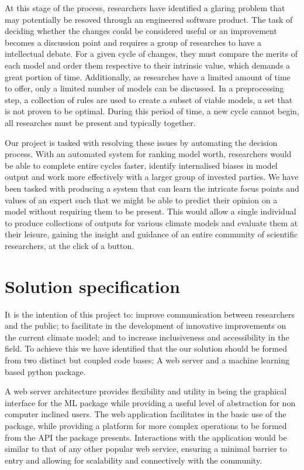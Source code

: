 \documentclass{ecmm427_assignment}
\begin{document}
At this stage of the process, researchers have identified a glaring problem that may potentially be resoved through an engineered software product. The task of deciding whether the changes could be considered useful or an improvement becomes a discussion point and requires a group of researches to have a intellectual debate. For a given cycle of changes, they must compare the merits of each model and order them respective to their intrinsic value, which demands a great portion of time. Additionally, as researches have a limited amount of time to offer, only a limited number of models can be discussed. In a preprocessing step, a collection of rules are used to create a subset of viable models, a set that is not proven to be optimal. During this period of time, a new cycle cannot begin, all researches must be present and typically together.

Our project is tasked with resolving these issues by automating the decision process. With an automated system for ranking model worth, researchers would be able to complete entire cycles faster, identify internalised biases in model output and work more effectively with a larger group of invested parties. We have been tasked with producing a system that can learn the intricate focus points and values of an expert such that we might be able to predict their opinion on a model without requiring them to be present. This would allow a single individual to produce collections of outputs for various climate models and evaluate them at their leisure, gaining the insight and guidance of an entire community of scientific researchers, at the click of a button.

\section{Solution specification}

It is the intention of this project to: improve communication between researchers and the public; to facilitate in the development of innovative improvements on the current climate model; and to increase inclusiveness and accessibility in the field. To achieve this we have identified that the our solution should be formed from two distinct but coupled code bases: A web server and a machine learning based python package.

A web server architecture provides flexibility and utility in being the graphical interface for the ML package while providing a useful level of abstraction for non computer inclined users. The web application facilitates in the basic use of the package, while providing a platform for more complex operations to be formed from the API the package presents. Interactions with the application would be similar to that of any other popular web service, ensuring a minimal barrier to entry and allowing for scalability and connectively with the community.
\end{document}
